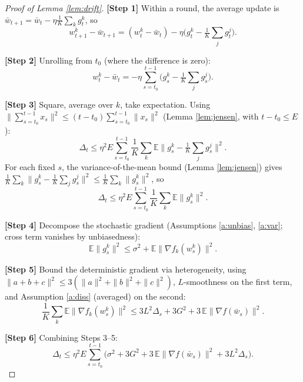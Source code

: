 \documentclass[11pt]{article}
\begin{document}
\begin{proof}[Proof of Lemma \ref{lem:drift}]
\textbf{[Step 1]} Within a round, the average update is
$\bar w_{t+1} = \bar w_t - \eta \frac{1}{K}\sum_k g_t^k$, so
\[
w_{t+1}^k - \bar w_{t+1}
= (w_t^k - \bar w_t) - \eta\Big(g_t^k - \tfrac{1}{K}\sum_j g_t^j\Big).
\]

\textbf{[Step 2]} Unrolling from $t_0$ (where the difference is zero):
\[
w_t^k - \bar w_t
= -\eta \sum_{s=t_0}^{t-1}\Big(g_s^k - \tfrac{1}{K}\sum_j g_s^j\Big).
\]

\textbf{[Step 3]} Square, average over $k$, take expectation. Using
$\|\sum_{s=t_0}^{t-1} x_s\|^2 \le (t-t_0)\sum_{s=t_0}^{t-1}\|x_s\|^2$
(Lemma \ref{lem:jensen}, with $t-t_0\le E$):
\[
\Delta_t
\le \eta^2 E \sum_{s=t_0}^{t-1}
   \frac1K\sum_k \mathbb{E}\Big\|g_s^k - \tfrac1K\sum_j g_s^j\Big\|^2 .
\]
For each fixed $s$, the variance-of-the-mean bound (Lemma \ref{lem:jensen})
gives
$\frac1K\sum_k\|g_s^k-\frac1K\sum_j g_s^j\|^2 \le \frac1K\sum_k\|g_s^k\|^2$,
so
\[
\Delta_t
\le \eta^2 E \sum_{s=t_0}^{t-1}
   \frac1K\sum_k \mathbb{E}\|g_s^k\|^2 .
\]

\textbf{[Step 4]} Decompose the stochastic gradient (Assumptions
\ref{a:unbias}, \ref{a:var}; cross term vanishes by unbiasedness):
\[
\mathbb{E}\|g_s^k\|^2
\le \sigma^2 + \mathbb{E}\|\nabla f_k(w_s^k)\|^2 .
\]

\textbf{[Step 5]} Bound the deterministic gradient via heterogeneity, using
$\|a+b+c\|^2 \le 3(\|a\|^2+\|b\|^2+\|c\|^2)$, $L$-smoothness on the first term,
and Assumption \ref{a:diss} (averaged) on the second:
\[
\frac{1}{K}\sum_k \mathbb{E}\|\nabla f_k(w_s^k)\|^2
\le 3L^2 \Delta_s + 3G^2 + 3\,\mathbb{E}\|\nabla f(\bar w_s)\|^2 .
\]

\textbf{[Step 6]} Combining Steps 3--5:
\[
\Delta_t
\le \eta^2 E \sum_{s=t_0}^{t-1}
\Big(\sigma^2 + 3G^2 + 3\,\mathbb{E}\|\nabla f(\bar w_s)\|^2 + 3L^2 \Delta_s\Big).
\tag{6.1}
\]


\end{proof}
\end{document}

